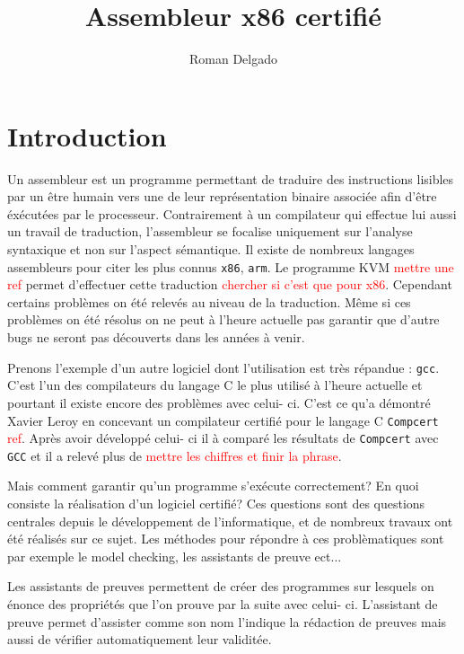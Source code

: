 \documentclass {article}
\title{Assembleur x86 certifié}
\author{Roman Delgado}
\date{}
\theoremstyle{definition}
\theoremstyle{remark}
\newcommand{\todo}[1]{\textcolor{red}{#1}}
\newcommand{\fun}[1]{\lstinline!#1!}
\begin{document}
\maketitle



\vfill
\setcounter{tocdepth}{2}
\tableofcontents
\vfill


\section{Introduction}

Un assembleur est un programme permettant de traduire des instructions lisibles par un être humain vers
une de leur représentation binaire associée afin d'être éxécutées par le processeur. Contrairement à un compilateur
qui effectue lui aussi un travail de traduction, l'assembleur se focalise uniquement sur l'analyse syntaxique
et non sur l'aspect sémantique.
Il existe de nombreux langages 
assembleurs pour citer les plus connus \fun{x86}, \fun{arm}.
Le programme KVM \todo{mettre une ref}
permet d'effectuer cette traduction \todo{chercher si c'est que pour x86}.
Cependant certains problèmes on été relevés au niveau de la traduction.
Même si ces problèmes on été résolus on ne peut à l'heure actuelle pas garantir que d'autre bugs ne seront pas
découverts dans les années à venir.

Prenons l'exemple d'un autre logiciel dont l'utilisation est très répandue : \fun{gcc}. C'est l'un des compilateurs
du langage C le plus utilisé à l'heure actuelle et pourtant il existe encore des
problèmes avec celui- ci. C'est ce qu'a démontré Xavier Leroy en concevant un compilateur certifié pour le langage C \fun{Compcert}
\todo{ref}. Après avoir développé celui- ci il à comparé les résultats de \fun{Compcert} avec \fun{GCC}
et il a relevé plus de \todo{mettre les chiffres et finir la phrase}.


Mais comment garantir qu'un programme s'exécute correctement? En quoi consiste la réalisation d'un logiciel certifié?
Ces questions sont des questions centrales depuis le développement de l'informatique, et de nombreux travaux ont été
réalisés sur ce sujet. Les méthodes pour répondre à ces problèmatiques sont par exemple le model checking, les assistants
de preuve ect...


Les assistants de preuves permettent de créer des programmes sur lesquels on énonce des propriétés que l'on prouve par
la suite avec celui- ci. L'assistant de preuve permet d'assister comme son nom l'indique la rédaction de preuves mais
aussi de vérifier automatiquement leur validitée.
\end{document}
